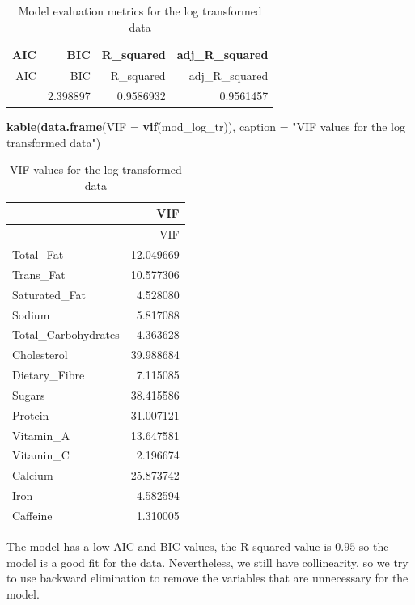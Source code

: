 \documentclass[
]{article}
\newenvironment{Shaded}{\begin{snugshade}}{\end{snugshade}}
\newcommand{\AttributeTok}[1]{\textcolor[rgb]{0.13,0.29,0.53}{#1}}
\newcommand{\FunctionTok}[1]{\textcolor[rgb]{0.13,0.29,0.53}{\textbf{#1}}}
\newcommand{\NormalTok}[1]{#1}
\newcommand{\StringTok}[1]{\textcolor[rgb]{0.31,0.60,0.02}{#1}}
\begin{document}
\begin{longtable}[]{@{}rrrr@{}}
\caption{Model evaluation metrics for the log transformed
data}\tabularnewline
\toprule\noalign{}
AIC & BIC & R\_squared & adj\_R\_squared \\
\midrule\noalign{}
\endfirsthead
\toprule\noalign{}
AIC & BIC & R\_squared & adj\_R\_squared \\
\midrule\noalign{}
\endhead
\bottomrule\noalign{}
\endlastfoot
-53.42411 & 2.398897 & 0.9586932 & 0.9561457 \\
\end{longtable}

\begin{Shaded}
\begin{Highlighting}[]
\FunctionTok{kable}\NormalTok{(}\FunctionTok{data.frame}\NormalTok{(}\AttributeTok{VIF =} \FunctionTok{vif}\NormalTok{(mod\_log\_tr)),}
      \AttributeTok{caption =} \StringTok{"VIF values for the log transformed data"}\NormalTok{)}
\end{Highlighting}
\end{Shaded}

\begin{longtable}[]{@{}lr@{}}
\caption{VIF values for the log transformed data}\tabularnewline
\toprule\noalign{}
& VIF \\
\midrule\noalign{}
\endfirsthead
\toprule\noalign{}
& VIF \\
\midrule\noalign{}
\endhead
\bottomrule\noalign{}
\endlastfoot
Total\_Fat & 12.049669 \\
Trans\_Fat & 10.577306 \\
Saturated\_Fat & 4.528080 \\
Sodium & 5.817088 \\
Total\_Carbohydrates & 4.363628 \\
Cholesterol & 39.988684 \\
Dietary\_Fibre & 7.115085 \\
Sugars & 38.415586 \\
Protein & 31.007121 \\
Vitamin\_A & 13.647581 \\
Vitamin\_C & 2.196674 \\
Calcium & 25.873742 \\
Iron & 4.582594 \\
Caffeine & 1.310005 \\
\end{longtable}

The model has a low AIC and BIC values, the R-squared value is \(0.95\)
so the model is a good fit for the data. Nevertheless, we still have
collinearity, so we try to use backward elimination to remove the
variables that are unnecessary for the model.
\end{document}
